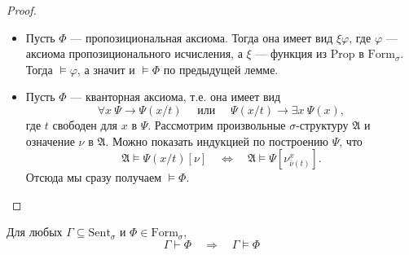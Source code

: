 \documentclass[12pt,a4paper]{article}
\newcommand{\Prop}{\ensuremath{\mathrm{Prop}}\xspace}
\newcommand{\Formul}{\ensuremath{\mathrm{Form}}\xspace}
\newcommand{\Sent}{\ensuremath{\mathrm{Sent}}\xspace}
\begin{document}
    \begin{proof}
        \begin{itemize}
            \item Пусть $\Phi$ --- пропозициональная аксиома. Тогда она имеет вид $\xi \varphi$, где $\varphi$ --- аксиома пропозиционального исчисления, а $\xi$ --- функция из $\Prop$ в $\Formul_\sigma$. Тогда $\vDash \varphi$, а значит и $\vDash \Phi$ по предыдущей лемме.

            \item Пусть $\Phi$ --- кванторная аксиома, т.е. она имеет вид
                \[
                    \forall x\ \Psi \rightarrow \Psi(x/t)
                    \quad \text{ или } \quad
                    \Psi(x/t) \rightarrow \exists x\ \Psi(x),
                \]
                где $t$ свободен для $x$ в $\Psi$. Рассмотрим произвольные $\sigma$-структуру $\mathfrak{A}$ и означение $\nu$ в $\mathfrak{A}$. Можно показать индукцией по построению $\Psi$, что
                \[
                    \mathfrak{A} \vDash \Psi(x/t) [\nu]
                    \quad \Longleftrightarrow \quad
                    \mathfrak{A} \vDash \Psi [\nu_{\overline{\nu}(t)}^x].
                \]
                Отсюда мы сразу получаем $\vDash \Phi$.
        \end{itemize}
    \end{proof}

    \begin{theorem}
        Для любых $\Gamma \subseteq \Sent_\sigma$ и $\Phi \in \Formul_\sigma$,
        \[
            \Gamma \vdash \Phi
            \quad \Longrightarrow \quad
            \Gamma \vDash \Phi
        \]
    \end{theorem}
\end{document}
